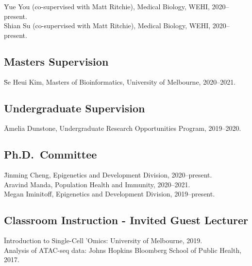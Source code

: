 \documentclass[11pt,letterpaper,pdf]{article}
\begin{document}
{\begin{tabbing}
 \=Yue You (co-supervised with Matt Ritchie), Medical Biology, WEHI, 2020--present.\\
 \>Shian Su (co-supervised with Matt Ritchie), Medical Biology, WEHI, 2020--present.\\
\end{tabbing}

\subsection*{Masters Supervision}

\begin{tabbing}
 \=Se Heui Kim, Masters of Bioinformatics, University of Melbourne, 2020--2021.\\
\end{tabbing}

\subsection*{Undergraduate Supervision}

\begin{tabbing}
  \=Amelia Dunstone, Undergraduate Research Opportunities Program, 2019--2020.\\
\end{tabbing}

\subsection*{Ph.D.\ Committee}

\begin{tabbing}
  \=Jinming Cheng, Epigenetics and Development Division, 2020--present.\\
  \>Aravind Manda, Population Health and Immunity, 2020--2021.\\
  \>Megan Iminitoff, Epigenetics and Development Division, 2019--present.\\
\end{tabbing}

\subsection*{Classroom Instruction - Invited Guest Lecturer}

\begin{tabbing}
  \=Introduction to Single-Cell 'Omics: University of Melbourne, 2019.\\
  \>Analysis of ATAC-seq data: Johns Hopkins Bloomberg School of Public Health, 2017.
\end{tabbing}

}
\end{document}
